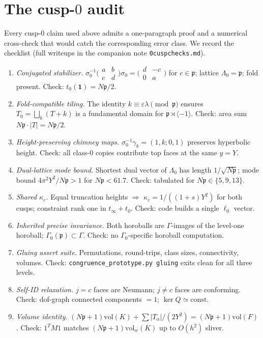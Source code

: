 \documentclass[11pt]{amsart}
\newcommand{\p}{\mathfrak{p}}
\newcommand{\vol}{\mathrm{vol}}
\begin{document}
\appendix
\section{The cusp-$0$ audit}

Every cusp-$0$ claim used above admits a one-paragraph proof and a
numerical cross-check that would catch the corresponding error class.
We record the checklist (full writeups in the companion note
\texttt{0cuspchecks.md}).

\begin{enumerate}
\item[\textbf{C1.}] \emph{Conjugated stabilizer.}
  $\sigma_0^{-1}\bigl(\begin{smallmatrix}a&b\\c&d\end{smallmatrix}\bigr)
  \sigma_0=\bigl(\begin{smallmatrix}d&-c\\0&a\end{smallmatrix}\bigr)$
  for $c\in\p$; lattice $\Lambda_0=\p$; fold present.  Check:
  $t_0(\mathbf{1})=N\p/2$.
\item[\textbf{C2.}] \emph{Fold-compatible tiling.}
  The identity $k\equiv\varepsilon\lambda\pmod\p$ ensures
  $T_0=\bigsqcup_k(T+k)$ is a fundamental domain for
  $\p\rtimes\langle -1\rangle$.  Check: area sum $N\p\cdot|T|=N\p/2$.
\item[\textbf{C3.}] \emph{Height-preserving chimney maps.}
  $\sigma_0^{-1}\gamma_k=(1,k;0,1)$ preserves hyperbolic height.  Check:
  all class-$0$ copies contribute top faces at the same $y=Y$.
\item[\textbf{C4.}] \emph{Dual-lattice mode bound.}
  Shortest dual vector of $\Lambda_0$ has length $1/\sqrt{N\p}$; mode
  bound $4\pi^2 Y^2/N\p>1$ for $N\p<61.7$.  Check: tabulated for
  $N\p\in\{5,9,13\}$.
\item[\textbf{C5.}] \emph{Shared $\kappa_c$.}
  Equal truncation heights $\Rightarrow$
  $\kappa_c=1/((1+s)Y^2)$ for both cusps; constraint rank one in
  $t_\infty+t_0$.  Check: code builds a single $\ell_0$ vector.
\item[\textbf{C6.}] \emph{Inherited precise invariance.}
  Both horoballs are $\Gamma$-images of the level-one horoball;
  $\Gamma_0(\p)\subset\Gamma$.  Check: no $\Gamma_0$-specific horoball
  computation.
\item[\textbf{C7.}] \emph{Gluing assert suite.}
  Permutations, round-trips, class sizes, connectivity, volumes.  Check:
  \texttt{congruence\_prototype.py gluing} exits clean for all three
  levels.
\item[\textbf{C8.}] \emph{Self-ID relaxation.}
  $j=c$ faces are Neumann; $j\neq c$ faces are conforming.  Check:
  dof-graph connected components $=1$; $\ker Q\simeq\mathrm{const}$.
\item[\textbf{C9.}] \emph{Volume identity.}
  $(N\p+1)\vol(K)+\sum|T_\alpha|/(2Y^2)=(N\p+1)\vol(F)$.  Check:
  $1^TM1$ matches $(N\p+1)\vol_w(K)$ up to $O(h^2)$ sliver.
\end{enumerate}
\end{document}
